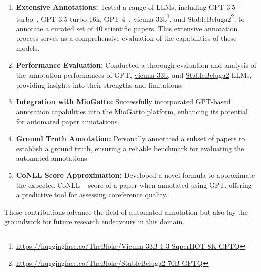 \begin{enumerate}
    \item \textbf{Extensive Annotations:} Tested a range of LLMs, including GPT-3.5-turbo~\citep{openai2023}, GPT-3.5-turbo-16k, GPT-4~\citep{2303.08774}, \href{https://huggingface.co/TheBloke/Vicuna-33B-1-3-SuperHOT-8K-GPTQ}{vicuna-33b}\footnote{\url{https://huggingface.co/TheBloke/Vicuna-33B-1-3-SuperHOT-8K-GPTQ}}\citep{zheng2023judging}, and \href{https://huggingface.co/TheBloke/StableBeluga2-70B-GPTQ}{StableBeluga2}\footnote{\url{https://huggingface.co/TheBloke/StableBeluga2-70B-GPTQ}}\citep{StableBelugaModels, touvron2023llama, mukherjee2023orca}, to annotate a curated set of 40 scientific papers. This extensive annotation process serves as a comprehensive evaluation of the capabilities of these models.
    
    \item \textbf{Performance Evaluation:} Conducted a thorough evaluation and analysis of the annotation performances of GPT, \href{https://huggingface.co/TheBloke/Vicuna-33B-1-3-SuperHOT-8K-GPTQ}{vicuna-33b}, and \href{https://huggingface.co/TheBloke/StableBeluga2-70B-GPTQ}{StableBeluga2} LLMs, providing insights into their strengths and limitations.
    
    \item \textbf{Integration with MioGatto:} Successfully incorporated GPT-based annotation capabilities into the MioGatto platform, enhancing its potential for automated paper annotations.
    
    \item \textbf{Ground Truth Annotation:} Personally annotated a subset of papers to establish a ground truth, ensuring a reliable benchmark for evaluating the automated annotations.
    
    \item \textbf{CoNLL Score Approximation:} Developed a novel formula to approximate the expected CoNLL ~\citep{pradhan2012conll} score of a paper when annotated using GPT, offering a predictive tool for assessing coreference quality.
\end{enumerate}


These contributions advance the field of automated annotation but also lay the groundwork for future research endeavours in this domain.


